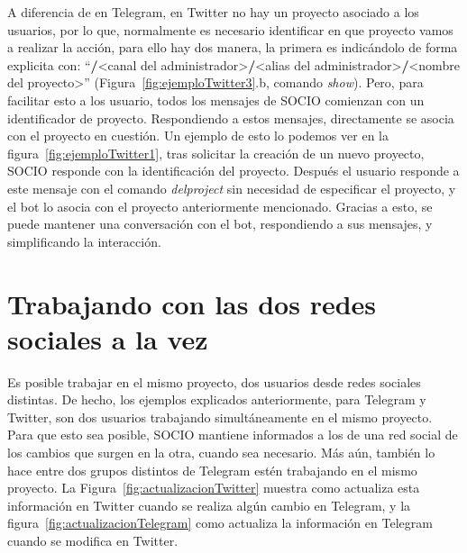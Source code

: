 
A diferencia de en Telegram, en Twitter no hay un proyecto asociado a los usuarios, por lo que, normalmente es necesario identificar en que proyecto vamos a realizar la acción, para ello hay dos manera, la primera es indicándolo de forma explicita con: ``\textbf{/}<canal del administrador>\textbf{/}<alias del administrador>\textbf{/}<nombre del proyecto>'' (Figura~\ref{fig:ejemploTwitter3}.b, comando \textit{show}). Pero, para facilitar esto a los usuario, todos los mensajes de SOCIO comienzan con un identificador de proyecto. Respondiendo a estos mensajes, directamente se asocia con el proyecto en cuestión. Un ejemplo de esto lo podemos ver en la figura~\ref{fig:ejemploTwitter1}, tras solicitar la creación de un nuevo proyecto, SOCIO responde con la identificación del proyecto. Después el usuario responde a este mensaje con el comando \textit{delproject} sin necesidad de especificar el proyecto, y el bot lo asocia con el proyecto anteriormente mencionado. Gracias a esto, se puede mantener una conversación con el bot, respondiendo a sus mensajes, y simplificando la interacción.

\section{Trabajando con las dos redes sociales a la vez}
Es posible trabajar en el mismo proyecto, dos usuarios desde redes sociales distintas. De hecho, los ejemplos explicados anteriormente, para Telegram y Twitter, son dos usuarios trabajando simultáneamente en el mismo proyecto. Para que esto sea posible, SOCIO mantiene informados a los de una red social de los cambios que surgen en la otra, cuando sea necesario. Más aún, también lo hace entre dos grupos distintos de Telegram estén trabajando en el mismo proyecto. La Figura~\ref{fig:actualizacionTwitter} muestra como actualiza esta información en Twitter cuando se realiza algún cambio en Telegram, y la figura~\ref{fig:actualizacionTelegram} como actualiza la información en Telegram cuando se modifica en Twitter. \\

